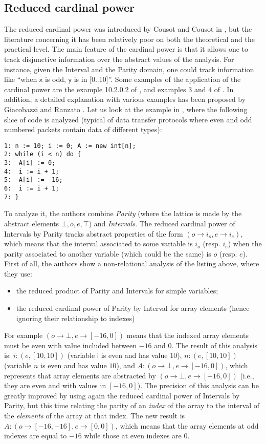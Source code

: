 \documentclass[submission,copyright,creativecommons]{eptcs}
\newcommand{\statement}[1]{\ensuremath{\mathsf{#1}}}
\begin{document}
\subsection{Reduced cardinal power}
The reduced cardinal power was introduced by Cousot and Cousot in \cite{CC79}, but the literature concerning it has been relatively poor on both the theoretical and the practical level. The main feature of the cardinal power is that it allows one to track disjunctive information over the abstract values of the analysis. For instance, given the Interval and the Parity domain, one could track information like \textquotedblleft when \statement{x} is odd, \statement{y} is in [0..10]\textquotedblright. Some examples of the application of the cardinal power are the example 10.2.0.2 of \cite{CC79}, and examples 3 and 4 of \cite{CCL11}. In addition, a detailed explanation with various examples has been proposed by Giacobazzi and Ranzato \cite{GR99}. Let us look at the example in \cite{CCL11}, where the following slice of
code is analyzed (typical of data transfer protocols where even and odd numbered packets contain data of different types):
\lstset{numbers=none}
\begin{lstlisting}
1: n := 10; i := 0; A := new int[n];
2: while (i < n) do {
3:  A[i] := 0;
4:  i := i + 1;
5:  A[i] := -16;
6:  i := i + 1;
7: }
\end{lstlisting}
To analyze it, the authors combine \textit{Parity} (where the lattice is made by the abstract elements $\bot, o, e, \top$) and \textit{Intervals}. The reduced cardinal power of Intervals by Parity tracks abstract properties of the form $(o \rightarrow i_o, e \rightarrow i_e)$, which means that the interval associated to some variable is $i_o$ (resp. $i_e$) when the parity associated to another variable (which could be the same) is $o$ (resp. $e$). First of all, the authors show a non-relational analysis of the listing above, where they use:
\begin{itemize}
\item the reduced product of Parity and Intervals for simple variables;
\item the reduced cardinal power of Parity by Interval for array elements (hence ignoring their relationship to indexes)
\end{itemize}
For example $(o \rightarrow \bot, e \rightarrow [-16,0])$ means that the indexed array elements must be even with value included between $-16$ and $0$. The result of this analysis is: $i: (e, [10,10])$ (variable \statement{i} is even and has value $10$), $n: (e, [10,10])$ (variable $n$ is even and has value $10$), and $A: (o \rightarrow \bot , e \rightarrow [-16,0])$, which represents that array elements are abstracted by $(o \rightarrow \bot , e \rightarrow [-16,0])$ (i.e., they are even and with values in $[-16,0]$). The precision of this analysis can be greatly improved by using again the reduced cardinal power of Intervals by Parity, but this time relating the parity of an \textit{index} of the array to the interval of the \textit{elements} of the array at that index. The new result is $A: (o \rightarrow [-16,-16], e \rightarrow [0,0])$, which means that the array elements at odd indexes are equal to $-16$ while those at even indexes are $0$.
\end{document}
